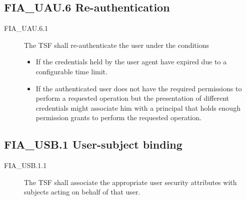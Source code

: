 \documentclass[10pt,a4paper,english]{book}
\begin{document}

\hypertarget{fia-uau-6-re-authentication}{}
\subsection{FIA{\_}UAU.6 Re-authentication}
\begin{description}
\item[FIA{\_}UAU.6.1 ]

The TSF shall re-authenticate the user under the conditions
\begin{itemize}
\item {} 
If the credentials held by the user agent have expired due to
a configurable time limit.

\item {} 
If the authenticated user does not have the required permissions to
perform a requested operation but the presentation of different
credentials might associate him with a principal that holds enough
permission grants to perform the requested operation.

\end{itemize}

\end{description}



\hypertarget{fia-usb-1-user-subject-binding}{}
\subsection{FIA{\_}USB.1 User-subject binding}
\begin{description}
\item[FIA{\_}USB.1.1]

The TSF shall associate the appropriate user security
attributes with subjects acting on behalf of that user.

\end{description}


\end{document}
